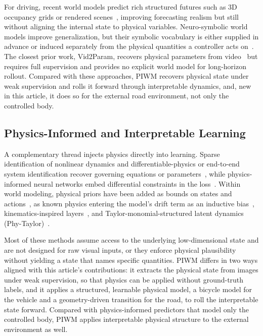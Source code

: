 \documentclass[preprint,12pt]{elsarticle}
\begin{document}
For driving, recent world models predict rich structured futures such as 3D
occupancy grids or rendered scenes~\cite{zheng2024occworld, min2023uniworld,
yan2024renderworld, zuo2024gaussianworld}, improving forecasting realism but still
without aligning the internal state to physical variables.
Neuro-symbolic world models improve generalization, but their symbolic vocabulary
is either supplied in advance or induced separately from the physical
quantities a controller acts on~\cite{balloch2023neuro, liang2024visualpredicator}.
The closest prior work, Vid2Param, recovers physical parameters from
video~\cite{asenov2019vid2param} but requires full supervision and provides no
explicit world model for long-horizon rollout.
Compared with these approaches, PIWM recovers physical state under weak
supervision and rolls it forward through interpretable dynamics, and, new in this
article, it does so for the external road environment, not only the controlled
body.

\subsection{Physics-Informed and Interpretable Learning}\label{sec:rw_phys}

A complementary thread injects physics directly into learning.
Sparse identification of nonlinear dynamics and differentiable-physics or
end-to-end system identification recover governing equations or
parameters~\cite{BRUNTON2016710, de2018end, yao2024marrying}, while
physics-informed neural networks embed differential constraints in the
loss~\cite{cai2021physics, ZHONG2023115664}.
Within world modeling, physical priors have been added as bounds on states and
actions~\cite{tumu2023physics, sridhar2023guaranteed}, as known physics entering
the model's drift term as an inductive bias~\cite{djeumou2023learn},
kinematics-inspired layers~\cite{cui2020deep}, and
Taylor-monomial-structured latent dynamics (Phy-Taylor)~\cite{mao_phy-taylor_2025}.

Most of these methods assume access to the underlying low-dimensional state and
are not designed for raw visual inputs, or they enforce physical plausibility
without yielding a state that names specific quantities.
PIWM differs in two ways aligned with this article's contributions: it extracts
the physical state from images under weak supervision, so that physics can be
applied without ground-truth labels, and it applies a structured, learnable
physical model, a bicycle model for the vehicle and a geometry-driven transition
for the road, to roll the interpretable state forward.
Compared with physics-informed predictors that model only the controlled body,
PIWM applies interpretable physical structure to the external environment as well.
\end{document}

